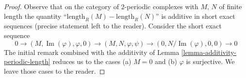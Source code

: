 \documentclass[10pt,a4paper]{amsart}
\theoremstyle{plain}
\theoremstyle{definition}
\theoremstyle{remark}
\numberwithin{equation}{subsection}
\def\Im{\mathop{\mathrm{Im}}}
\begin{document}
\begin{proof}
Observe that on the category of $2$-periodic complexes with $M$, $N$
of finite length the quantity ``$\text{length}_R(M) - \text{length}_R(N)$''
is additive in short exact sequences (precise statement left to the reader).
Consider the short exact sequence
$$
0 \to (M, \Im(\varphi), \varphi, 0) \to
(M, N, \varphi, \psi) \to (0, N/\Im(\varphi), 0, 0) \to 0
$$
The initial remark combined with the additivity of
Lemma \ref{lemma-additivity-periodic-length}
reduces us to the cases (a) $M = 0$ and (b) $\varphi$ is surjective.
We leave those cases to the reader.
\end{proof}
\end{document}
